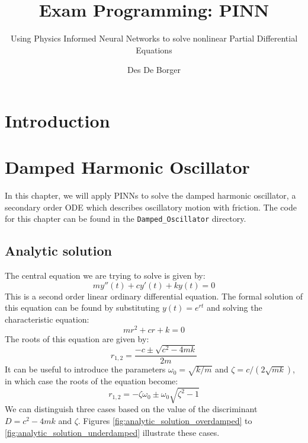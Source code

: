 \documentclass[we,twoside,openright,a4paper,11pt]{uantwerpenbamathesis}
\title{Exam Programming: PINN} %
\subtitle{Using Physics Informed Neural Networks to solve nonlinear Partial Differential Equations}
\author{Des De Borger}
\begin{document}
\maketitle

\frontmatter

\tableofcontents

\mainmatter

\chapter{Introduction}

\chapter{Damped Harmonic Oscillator}
In this chapter, we will apply PINNs to solve the damped harmonic oscillator, a secondary order ODE which describes oscillatory motion with friction. The code for this chapter can be found in the \verb|Damped_Oscillator| directory.
\section{Analytic solution}
The central equation we are trying to solve is given by:
\begin{equation}\label{eq:damped_harmonic_oscillator}
    my''(t)+cy'(t)+ky(t)=0
\end{equation}
This is a second order linear ordinary differential equation. The formal solution of this equation can be found by substituting $y(t)=e^{rt}$ and solving the characteristic equation:
\begin{equation}\label{eq:damped_harmonic_oscillator_characteristic_equation}
     mr^2+cr+k=0
\end{equation}
The roots of this equation are given by:
\begin{equation}\label{eq:damped_harmonic_oscillator_roots}
    r_{1,2}=\frac{-c\pm\sqrt{c^2-4mk}}{2m}
\end{equation}
It can be useful to introduce the parameters $\omega_0=\sqrt{k/m}$ and $\zeta=c/(2\sqrt{mk})$, in which case the roots of the equation become:
\begin{equation}\label{eq:damped_harmonic_oscillator_roots_normalized}
    r_{1,2}=-\zeta\omega_0\pm\omega_0\sqrt{\zeta^2-1}
\end{equation}
We can distinguish three cases based on the value of the discriminant $D=c^2-4mk$ and $\zeta$. Figures \ref{fig:analytic_solution_overdamped} to \ref{fig:analytic_solution_underdamped} illustrate these cases.\\
\end{document}
